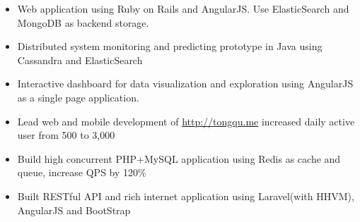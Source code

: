 \documentclass[10pt, letterpaper]{simple-cv}
\begin{document}
\begin{itemize}
\item Web application using Ruby on Rails and AngularJS. Use ElasticSearch and MongoDB as backend storage.
\end{itemize}

\begin{itemize}
\item Distributed system monitoring and predicting prototype in Java using Cassandra and ElasticSearch
\item Interactive dashboard for data visualization and exploration using AngularJS as a single page application.
\end{itemize}

\begin{itemize}
\item Lead web and mobile development of \url{http://tongqu.me} increased daily active user from 500 to 3,000
\item Build high concurrent PHP+MySQL application using Redis as cache and queue, increase QPS by 120\%
\item Built RESTful API and rich internet application using Laravel(with HHVM), AngularJS and BootStrap
\end{itemize}
\end{document}
